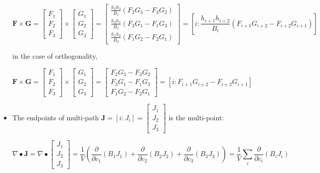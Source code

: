 \documentclass{book}
\begin{document}
\begin{itemize}
\[\mathbf{F} \times \mathbf{G} = \begin{bmatrix} F_1 \\ F_2 \\ F_3 \end{bmatrix} \times \begin{bmatrix} G_1 \\ G_2 \\ G_3 \end{bmatrix}
 = \begin{bmatrix} \frac{h_2 h_3}{B_1}(F_2 G_3 - F_3 G_2) \\ \frac{h_3 h_1}{B_2}(F_3 G_1 - F_1 G_3) \\ \frac{h_1 h_2}{B_3}(F_1 G_2 - F_2 G_1) \end{bmatrix}
 = \left[i : \frac{h_{i+1} h_{i+2}}{B_i} (F_{i+1} G_{i+2} - F_{i+2} G_{i+1})\right]\]

in the case of orthogonality,

\[\mathbf{F} \times \mathbf{G} = \begin{bmatrix} F_1 \\ F_2 \\ F_3 \end{bmatrix} \times \begin{bmatrix} G_1 \\ G_2 \\ G_3 \end{bmatrix}
 = \begin{bmatrix} F_2 G_3 - F_3 G_2 \\ F_3 G_1 - F_1 G_3 \\ F_1 G_2 - F_2 G_1 \end{bmatrix}
 = \left[i : F_{i+1} G_{i+2} - F_{i+2} G_{i+1}\right]\]


\item The endpoints of multi-path \(\mathbf{J} = [i : J_i] = \begin{bmatrix} J_1 \\ J_2 \\ J_3 \end{bmatrix}\) is the multi-point:

\[\nabla \bullet \mathbf{J} = \nabla \bullet \begin{bmatrix} J_1 \\ J_2 \\ J_3 \end{bmatrix} = \frac{1}{V}\left(\frac{\partial}{\partial c_1}(B_1 J_1) + \frac{\partial}{\partial c_2}(B_2 J_2) + \frac{\partial}{\partial c_3}(B_3 J_3)\right) = \frac{1}{V}\sum_i \frac{\partial}{\partial c_i} (B_i J_i)\]


\end{itemize}
\end{document}
